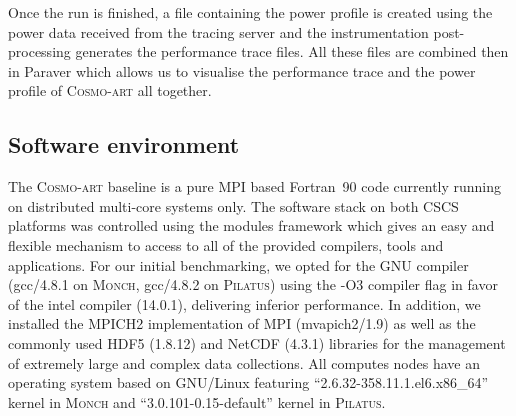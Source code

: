 Once  the run  is finished,  a file  containing the  power  profile is
created using the power data  received from the tracing server and the
instrumentation post-processing generates the performance trace files.
All  these files  are  combined then  in  Paraver which  allows us  to
visualise   the   performance  trace   and   the   power  profile   of
\textsc{Cosmo-art} all together.




\subsection{Software environment}
\label{subsec:3.2}

The \textsc{Cosmo-art}  baseline is a  pure MPI based  Fortran~90 code
currently  running  on   distributed  multi-core  systems  only.   The
software stack on both CSCS platforms was controlled using the modules
framework which gives an easy  and flexible mechanism to access to all
of the  provided compilers, tools  and applications.  For  our initial
benchmarking,   we  opted   for   the  GNU   compiler  (gcc/4.8.1   on
\textsc{Monch}, gcc/4.8.2 on  \textsc{Pilatus}) using the -O3 compiler
flag  in favor  of the  intel compiler  (14.0.1),  delivering inferior
performance.  In  addition, we installed the  MPICH2 implementation of
MPI  (mvapich2/1.9) as  well as  the commonly  used HDF5  (1.8.12) and
NetCDF  (4.3.1) libraries for  the management  of extremely  large and
complex data collections.  All computes nodes have an operating system
based on GNU/Linux featuring ``2.6.32-358.11.1.el6.x86\_64'' kernel in
\textsc{Monch}     and      ``3.0.101-0.15-default''     kernel     in
\textsc{Pilatus}.

